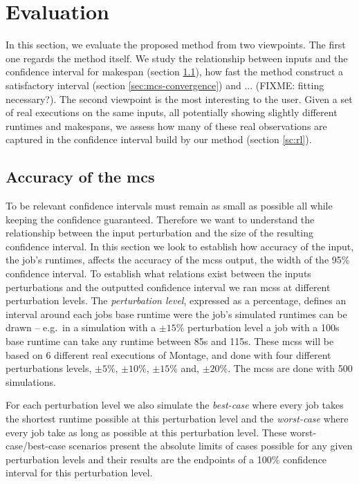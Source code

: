 \documentclass[10pt,conference,compsocconf]{IEEEtran}
\newcommand{\pmpc}[1]{$\pm#1\%$}
\begin{document}
\section{Evaluation}

In this section, we evaluate the  proposed method from two viewpoints. The first
one regards the method itself. We  study the relationship between inputs and the
confidence interval for makespan (section \ref {sec:mcs-accuracy}), how fast the
method construct a satisfactory interval (section \ref{sec:mcs-convergence}) and
... (FIXME: fitting necessary?). The second viewpoint is the most interesting to
the user.  Given a set  of real executions on  the same inputs,  all potentially
showing slightly different  runtimes and makespans, we assess how  many of these
real observations  are captured in the  confidence interval build by  our method
(section \ref{sc:rl}).
  


\subsection{Accuracy of the \acl{mcs}}
\label{sec:mcs-accuracy}

To be relevant  confidence intervals must remain as small  as possible all while
keeping  the  confidence  guaranteed.  Therefore   we  want  to  understand  the
relationship  between the  input  perturbation  and the  size  of the  resulting
confidence interval.  In this section we  look to establish how accuracy of the
input, the  job's runtimes, affects the accuracy of the \acp{mcs}  output, the
width  of the  95\%  confidence  interval.  To  establish  what relations  exist
between the  inputs perturbations and  the outputted confidence interval  we ran
\acp{mcs}  at different  perturbation  levels.   The \emph{perturbation  level},
expressed as  a percentage, defines  an interval  around each jobs  base runtime
were the job's  simulated runtimes can be  drawn -- e.g.~in a  simulation with a
\pmpc{15} perturbation level a job with a 100s base runtime can take any runtime
between  85s  and 115s.  These  \acp{mcs}  will be  based  on  6 different  real
executions  of  Montage, and  done  with  four different  perturbations  levels,
\pmpc{5}, \pmpc{10}, \pmpc{15} and, \pmpc{20}.   The \acp{mcs} are done with 500
simulations.

For each perturbation level we also simulate the \emph{best-case} where every
job takes the shortest runtime possible at this perturbation level and the
\emph{worst-case} where every job take as long as possible at this perturbation
level. These worst-case/best-case scenarios present the absolute limits of cases
possible for any given perturbation levels and their results are the endpoints
of a 100\% confidence interval for this perturbation level.
\end{document}
